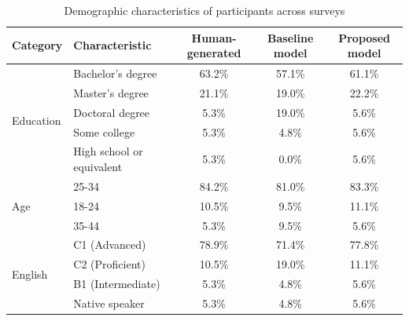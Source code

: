 \begin{table}[h]
    \centering
    \caption{Demographic characteristics of participants across surveys}
    \begin{tabular}{llccc}
        \hline
        Category & Characteristic & Human-generated & Baseline model & Proposed model \\
        \hline
        \multirow{5}{*}{Education} & Bachelor's degree & 63.2\% & 57.1\% & 61.1\% \\
        & Master's degree & 21.1\% & 19.0\% & 22.2\% \\
        & Doctoral degree & 5.3\% & 19.0\% & 5.6\% \\
        & Some college & 5.3\% & 4.8\% & 5.6\% \\
        & High school or equivalent & 5.3\% & 0.0\% & 5.6\% \\
        \hline
        \multirow{3}{*}{Age} & 25-34 & 84.2\% & 81.0\% & 83.3\% \\
        & 18-24 & 10.5\% & 9.5\% & 11.1\% \\
        & 35-44 & 5.3\% & 9.5\% & 5.6\% \\
        \hline
        \multirow{4}{*}{English} & C1 (Advanced) & 78.9\% & 71.4\% & 77.8\% \\
        & C2 (Proficient) & 10.5\% & 19.0\% & 11.1\% \\
        & B1 (Intermediate) & 5.3\% & 4.8\% & 5.6\% \\
        & Native speaker & 5.3\% & 4.8\% & 5.6\% \\
        \hline
    \end{tabular}
    \label{tab:demographics}
\end{table}





